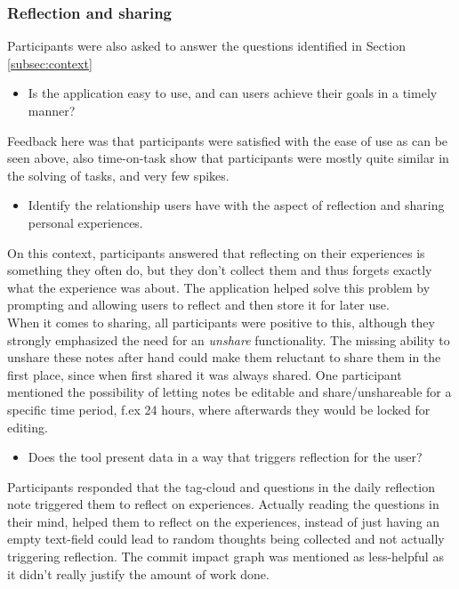 \subsubsection{Reflection and sharing}
\label{subsubsec:reflection}
Participants were also asked to answer the questions identified in Section \ref{subsec:context}
\begin{itemize}
	\item Is the application easy to use, and can users achieve their goals in a timely manner?
\end{itemize}
Feedback here was that participants were satisfied with the ease of use as can be seen above, also time-on-task show that participants were mostly quite similar in the solving of tasks, and very few spikes. 
\begin{itemize}
	\item Identify the relationship users have with the aspect of reflection and sharing personal experiences.
\end{itemize}
On this context, participants answered that reflecting on their experiences is something they often do, but they don't collect them and thus forgets exactly what the experience was about. The application helped solve this problem by prompting and allowing users to reflect and then store it for later use. \\
When it comes to sharing, all participants were positive to this, although they strongly emphasized the need for an \emph{unshare} functionality. The missing ability to unshare these notes after hand could make them reluctant to share them in the first place, since when first shared it was always shared. One participant mentioned the possibility of letting notes be editable and share/unshareable for a specific time period, f.ex 24 hours, where afterwards they would be locked for editing.  
\begin{itemize}
	\item Does the tool present data in a way that triggers reflection for the user?
\end{itemize}
Participants responded that the tag-cloud and questions in the daily reflection note triggered them to reflect on experiences. Actually reading the questions in their mind, helped them to reflect on the experiences, instead of just having an empty text-field could lead to random thoughts being collected and not actually triggering reflection. The commit impact graph was mentioned as less-helpful as it didn't really justify the amount of work done. 
	
